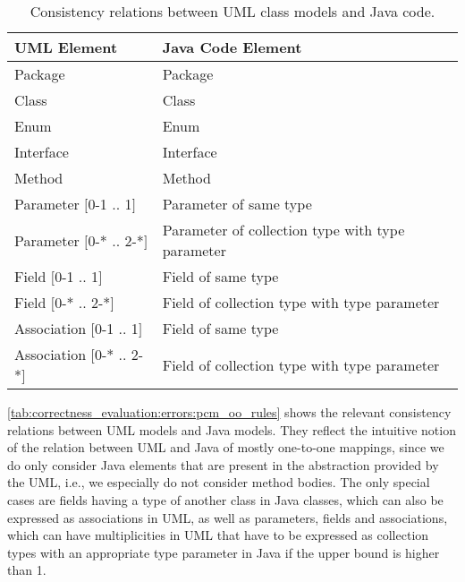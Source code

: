 \begin{table}
	\centering 
    \small
    \renewcommand{\arraystretch}{1.4}
	\begin{tabular}{p{3cm} p{6.8cm}}
		\toprule
        \textbf{\gls{UML} Element}  & \textbf{Java Code Element} \\
        \midrule
        Package                         & Package\\
		Class                           & Class\\
		Enum		                    & Enum \\
		Interface		   	            & Interface \\
        Method                          & Method \\
        Parameter $[$0-1 .. 1$]$        & Parameter of same type \\
        Parameter $[$0-* .. 2-*$]$      & Parameter of collection type with type parameter \\
        Field $[$0-1 .. 1$]$            & Field of same type\\
        Field $[$0-* .. 2-*$]$          & Field of collection type with type parameter\\
        Association $[$0-1 .. 1$]$      & Field of same type\\
        Association $[$0-* .. 2-*$]$    & Field of collection type with type parameter\\
		\bottomrule
	\end{tabular}
	\caption[Consistency relation between UML and Java]{Consistency relations between \gls{UML} class models and Java code.}
	\label{tab:correctness_evaluation:errors:uml_java_rules}
\end{table}

\autoref{tab:correctness_evaluation:errors:pcm_oo_rules} shows the relevant consistency relations between \gls{UML} models and Java models.
They reflect the intuitive notion of the relation between \gls{UML} and Java of mostly one-to-one mappings, since we do only consider Java elements that are present in the abstraction provided by the \gls{UML}, i.e., we especially do not consider method bodies.
The only special cases are fields having a type of another class in Java classes, which can also be expressed as associations in \gls{UML}, as well as parameters, fields and associations, which can have multiplicities in \gls{UML} that have to be expressed as collection types with an appropriate type parameter in Java if the upper bound is higher than 1.

